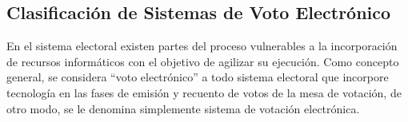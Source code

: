 \subsection{Clasificación de Sistemas de Voto Electrónico}
\label{ClasificacionVotoElectronico}

En el sistema electoral existen partes del proceso vulnerables a la incorporación de recursos informáticos con el objetivo de agilizar su ejecución. Como concepto general, se considera ``voto electrónico'' a todo sistema electoral que incorpore tecnología en las fases de emisión y recuento de votos de la mesa de votación, de otro modo, se le denomina simplemente sistema de votación electrónica.

